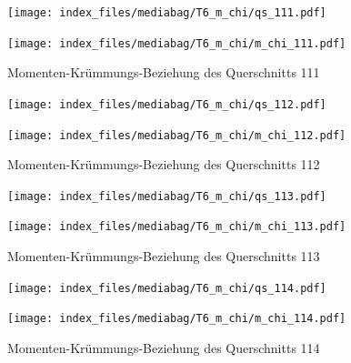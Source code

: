 \documentclass[
  11pt,
  letterpaper,
]{scrreprt}
\begin{document}
\begin{figure}[H]

\begin{minipage}{0.50\linewidth}
\texttt{[image: index\_files/mediabag/T6\_m\_chi/qs\_111.pdf]}\end{minipage}%
%
\begin{minipage}{0.50\linewidth}
\texttt{[image: index\_files/mediabag/T6\_m\_chi/m\_chi\_111.pdf]}\end{minipage}%

\caption{\label{fig-m_chi_appendix}Momenten-Krümmungs-Beziehung des
Querschnitts 111}

\end{figure}%

\begin{figure}[H]

\begin{minipage}{0.50\linewidth}
\texttt{[image: index\_files/mediabag/T6\_m\_chi/qs\_112.pdf]}\end{minipage}%
%
\begin{minipage}{0.50\linewidth}
\texttt{[image: index\_files/mediabag/T6\_m\_chi/m\_chi\_112.pdf]}\end{minipage}%

\caption{\label{fig-m_chi_appendix}Momenten-Krümmungs-Beziehung des
Querschnitts 112}

\end{figure}%

\begin{figure}[H]

\begin{minipage}{0.50\linewidth}
\texttt{[image: index\_files/mediabag/T6\_m\_chi/qs\_113.pdf]}\end{minipage}%
%
\begin{minipage}{0.50\linewidth}
\texttt{[image: index\_files/mediabag/T6\_m\_chi/m\_chi\_113.pdf]}\end{minipage}%

\caption{\label{fig-m_chi_appendix}Momenten-Krümmungs-Beziehung des
Querschnitts 113}

\end{figure}%

\begin{figure}[H]

\begin{minipage}{0.50\linewidth}
\texttt{[image: index\_files/mediabag/T6\_m\_chi/qs\_114.pdf]}\end{minipage}%
%
\begin{minipage}{0.50\linewidth}
\texttt{[image: index\_files/mediabag/T6\_m\_chi/m\_chi\_114.pdf]}\end{minipage}%

\caption{\label{fig-m_chi_appendix}Momenten-Krümmungs-Beziehung des
Querschnitts 114}

\end{figure}%
\end{document}
